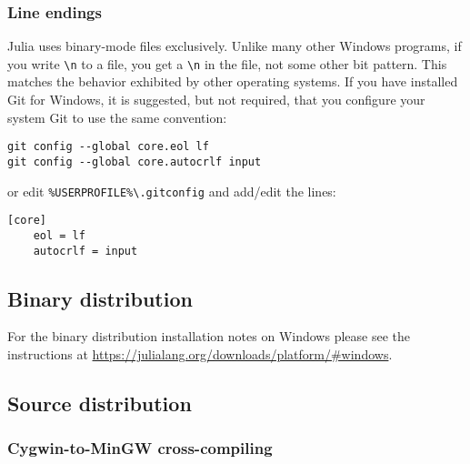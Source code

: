 \hypertarget{14641683579495570257}{}


\subsubsection{Line endings}



Julia uses binary-mode files exclusively. Unlike many other Windows programs, if you write \texttt{{\textbackslash}n} to a file, you get a \texttt{{\textbackslash}n} in the file, not some other bit pattern. This matches the behavior exhibited by other operating systems. If you have installed Git for Windows, it is suggested, but not required, that you configure your system Git to use the same convention:




\begin{lstlisting}
git config --global core.eol lf
git config --global core.autocrlf input
\end{lstlisting}



or edit \texttt{\%USERPROFILE\%{\textbackslash}.gitconfig} and add/edit the lines:




\begin{lstlisting}
[core]
    eol = lf
    autocrlf = input
\end{lstlisting}



\hypertarget{14077789474605882353}{}


\subsection{Binary distribution}



For the binary distribution installation notes on Windows please see the instructions at \href{https://julialang.org/downloads/platform/\#windows}{https://julialang.org/downloads/platform/\#windows}.



\hypertarget{11651987673758849221}{}


\subsection{Source distribution}



\hypertarget{7881402461160500543}{}


\subsubsection{Cygwin-to-MinGW cross-compiling}



